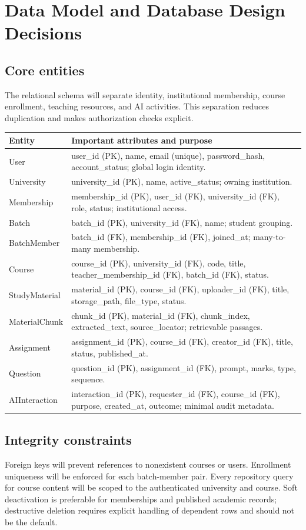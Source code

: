 \documentclass[11pt,a4paper]{article}
\begin{document}
\section{Data Model and Database Design Decisions}
\subsection{Core entities}
The relational schema will separate identity, institutional membership, course enrollment, teaching resources, and AI activities. This separation reduces duplication and makes authorization checks explicit.
\begin{longtable}{p{}p{}}
\toprule Entity & Important attributes and purpose\\\midrule\endhead
User & user\_id (PK), name, email (unique), password\_hash, account\_status; global login identity.\\
University & university\_id (PK), name, active\_status; owning institution.\\
Membership & membership\_id (PK), user\_id (FK), university\_id (FK), role, status; institutional access.\\
Batch & batch\_id (PK), university\_id (FK), name; student grouping.\\
BatchMember & batch\_id (FK), membership\_id (FK), joined\_at; many-to-many membership.\\
Course & course\_id (PK), university\_id (FK), code, title, teacher\_membership\_id (FK), batch\_id (FK), status.\\
StudyMaterial & material\_id (PK), course\_id (FK), uploader\_id (FK), title, storage\_path, file\_type, status.\\
MaterialChunk & chunk\_id (PK), material\_id (FK), chunk\_index, extracted\_text, source\_locator; retrievable passages.\\
Assignment & assignment\_id (PK), course\_id (FK), creator\_id (FK), title, status, published\_at.\\
Question & question\_id (PK), assignment\_id (FK), prompt, marks, type, sequence.\\
AIInteraction & interaction\_id (PK), requester\_id (FK), course\_id (FK), purpose, created\_at, outcome; minimal audit metadata.\\
\bottomrule
\end{longtable}
\subsection{Integrity constraints}
Foreign keys will prevent references to nonexistent courses or users. Enrollment uniqueness will be enforced for each batch-member pair. Every repository query for course content will be scoped to the authenticated university and course. Soft deactivation is preferable for memberships and published academic records; destructive deletion requires explicit handling of dependent rows and should not be the default.
\end{document}
